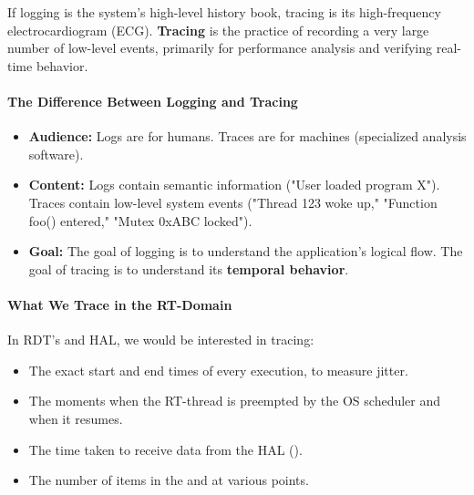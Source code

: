 If logging is the system's high-level history book, tracing is its high-frequency electrocardiogram (ECG). \textbf{Tracing} is the practice of recording a very large number of low-level events, primarily for performance analysis and verifying real-time behavior.

\paragraph{The Difference Between Logging and Tracing}
\begin{itemize}
    \item \textbf{Audience:} Logs are for humans. Traces are for machines (specialized analysis software).
    \item \textbf{Content:} Logs contain semantic information ("User loaded program X"). Traces contain low-level system events ("Thread 123 woke up," "Function foo() entered," "Mutex 0xABC locked").
    \item \textbf{Goal:} The goal of logging is to understand the application's logical flow. The goal of tracing is to understand its \textbf{temporal behavior}.
\end{itemize}

\paragraph{What We Trace in the RT-Domain}
In RDT's  and HAL, we would be interested in tracing:
\begin{itemize}
    \item The exact start and end times of every  execution, to measure jitter.
    \item The moments when the RT-thread is preempted by the OS scheduler and when it resumes.
    \item The time taken to receive data from the HAL ().
    \item The number of items in the  and  at various points.
\end{itemize}


